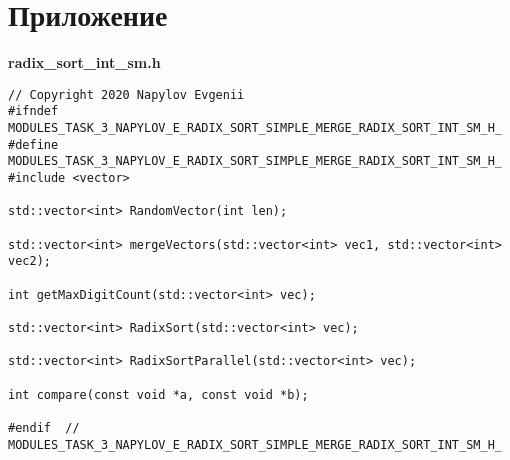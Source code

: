 \documentclass{report}
\begin{document}
	\newpage
	\section*{Приложение}
	
	\textbf{radix\_sort\_int\_sm.h}
	\begin{lstlisting}
// Copyright 2020 Napylov Evgenii
#ifndef MODULES_TASK_3_NAPYLOV_E_RADIX_SORT_SIMPLE_MERGE_RADIX_SORT_INT_SM_H_
#define MODULES_TASK_3_NAPYLOV_E_RADIX_SORT_SIMPLE_MERGE_RADIX_SORT_INT_SM_H_
#include <vector>

std::vector<int> RandomVector(int len);

std::vector<int> mergeVectors(std::vector<int> vec1, std::vector<int> vec2);

int getMaxDigitCount(std::vector<int> vec);

std::vector<int> RadixSort(std::vector<int> vec);

std::vector<int> RadixSortParallel(std::vector<int> vec);

int compare(const void *a, const void *b);

#endif  // MODULES_TASK_3_NAPYLOV_E_RADIX_SORT_SIMPLE_MERGE_RADIX_SORT_INT_SM_H_
	\end{lstlisting}
	
\end{document}
